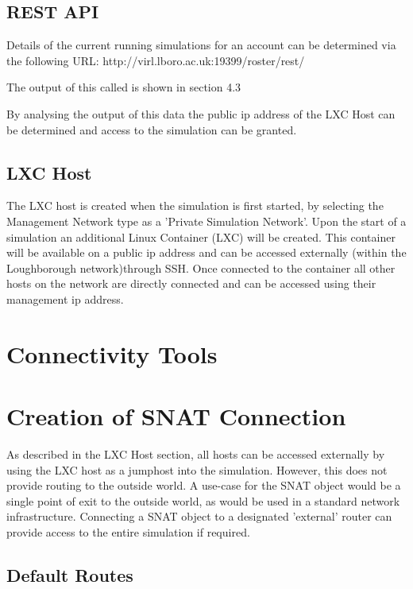 \documentclass[11pt]{report}
\begin{document}
\subsection*{REST API}

Details of the current running simulations for an account can be determined via the following URL: http://virl.lboro.ac.uk:19399/roster/rest/

The output of this called is shown in section 4.3

By analysing the output of this data the public ip address of the LXC Host can be determined and access to the simulation can be granted.

\subsection*{LXC Host}

The LXC host is created when the simulation is first started, by selecting the Management Network type as a 'Private Simulation Network'. Upon the start of a simulation an additional Linux Container (LXC) will be created. This container will be available on a public ip address and can be accessed externally (within the Loughborough network)through SSH. Once connected to the container all other hosts on the network are directly connected and can be accessed using their management ip address.

\section*{Connectivity Tools}

\section*{Creation of SNAT Connection}

As described in the LXC Host section, all hosts can be accessed externally by using the LXC host as a jumphost into the simulation. However, this does not provide routing to the outside world. A use-case for the SNAT object would be a single point of exit to the outside world, as would be used in a standard network infrastructure. Connecting a SNAT object to a designated 'external' router can provide access to the entire simulation if required.

\subsection*{Default Routes}
\end{document}
